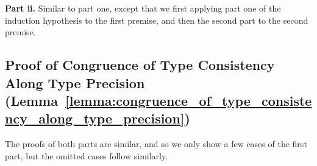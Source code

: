 \begin{itemize}
  \noindent
  \textbf{Part ii.} Similar to part one, except that we first
  applying part one of the induction hypothesis to the first
  premise, and then the second part to the second premise.
  
\end{itemize}


\subsection{Proof of Congruence of Type Consistency Along Type Precision (Lemma~\ref{lemma:congruence_of_type_consistency_along_type_precision})}
\label{subsec:proof_of_congruence_of_type_consistency_along_type_precision_lemma:congruence_of_type_consistency_along_type_precision}
The proofs of both parts are similar, and so we only show a few
cases of the first part, but the omitted cases follow similarly.

